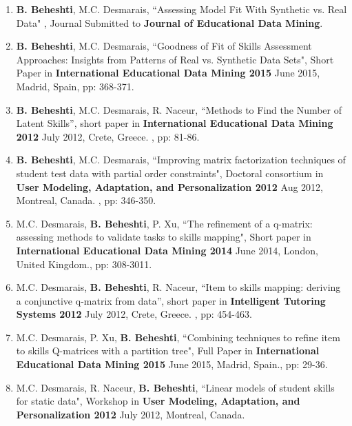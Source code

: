 \begin{enumerate}

\item \textbf{B. Beheshti}, M.C. Desmarais, “Assessing Model Fit With Synthetic vs. Real Data" , Journal Submitted to \textbf{Journal of Educational Data Mining}.

\item \textbf{B. Beheshti}, M.C. Desmarais, “Goodness of Fit of Skills Assessment Approaches: Insights from Patterns of Real vs. Synthetic Data Sets", Short Paper  in \textbf{International Educational Data Mining 2015} June 2015, Madrid, Spain, pp: 368-371.

\item \textbf{B. Beheshti}, M.C. Desmarais, R. Naceur, “Methods to Find the Number of Latent Skills”, short paper in \textbf{International Educational Data Mining 2012} July 2012, Crete, Greece. , pp: 81-86.

\item \textbf{B. Beheshti}, M.C. Desmarais, “Improving matrix factorization techniques of student test data with partial order constraints", Doctoral consortium in \textbf{User Modeling, Adaptation, and Personalization 2012} Aug 2012, Montreal, Canada. , pp: 346-350.

\item M.C. Desmarais, \textbf{B. Beheshti}, P. Xu, “The refinement of a q-matrix: assessing methods to validate tasks to skills mapping", Short paper in \textbf{International Educational Data Mining 2014} June 2014, London, United Kingdom., pp: 308-3011.

\item M.C. Desmarais, \textbf{B. Beheshti}, R. Naceur, “Item to skills mapping: deriving a conjunctive q-matrix from data”, short paper in \textbf{Intelligent Tutoring Systems 2012} July 2012, Crete, Greece. , pp: 454-463.

\item M.C. Desmarais, P. Xu, \textbf{B. Beheshti}, “Combining techniques to refine item to skills Q-matrices with a partition tree", Full Paper  in \textbf{International Educational Data Mining 2015} June 2015, Madrid, Spain., pp: 29-36.

\item M.C. Desmarais, R. Naceur, \textbf{B. Beheshti}, “Linear models of student skills for static data", Workshop in \textbf{User Modeling, Adaptation, and Personalization 2012} July 2012, Montreal, Canada.
\end{enumerate}


